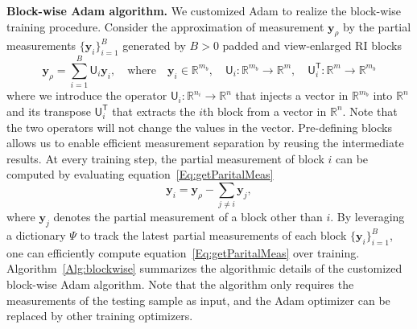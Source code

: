 \documentclass[11pt]{article}
\theoremstyle{plain} %
\def\ybm{{\bm{y}}}
\def\Tsf{{\mathsf{T}}}
\def\Usf{{\mathsf{U}}}
\def\R{\mathbb{R}}
\begin{document}
\vspace{0.5em}
\noindent
\textbf{Block-wise Adam algorithm.}
We customized Adam to realize the block-wise training procedure.
Consider the approximation of measurement $\ybm_\rho$ by the partial measurements $\{\ybm_i\}_{i=1}^B$ generated by $B>0$ padded and view-enlarged RI blocks
\begin{equation}
\label{Eq:approxY}
\ybm_\rho = \sum_{i=1}^B\Usf_i\ybm_i, \quad\text{where}\quad\ybm_i\in\R^{m_b},\quad\Usf_i:\R^{m_b}\rightarrow\R^{m},\quad\Usf_i^\Tsf:\R^{m}\rightarrow\R^{m_b}
\end{equation}
where we introduce the operator $\Usf_i: \R^{n_i} \rightarrow \R^n$ that injects a vector in $\R^{m_b}$ into $\R^n$ and its transpose $\Usf_i^\Tsf$ that extracts the $i$th block from a vector in $\R^n$. Note that the two operators will not change the values in the vector. 
Pre-defining blocks allows us to enable efficient measurement separation by reusing the intermediate results.
At every training step, the partial measurement of block $i$ can be computed by evaluating equation~\eqref{Eq:getParitalMeas}
\begin{equation}
\label{Eq:getParitalMeas}
\ybm_i = \ybm_\rho-\sum_{j\neq i} \ybm_j,
\end{equation}
where $\ybm_j$ denotes the partial measurement of a block other than $i$. By leveraging a dictionary $\Psi$ to track the latest partial measurements of each block $\{\ybm_i\}_{i=1}^B$, one can efficiently compute equation~\eqref{Eq:getParitalMeas} over training. 
Algorithm~\ref{Alg:blockwise} summarizes the algorithmic details of the customized block-wise Adam algorithm.
Note that the algorithm only requires the measurements of the testing sample as input, and the Adam optimizer can be replaced by other training optimizers.
\end{document}
